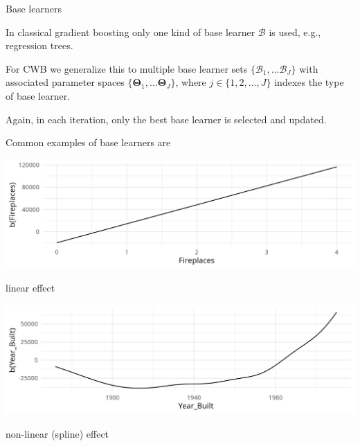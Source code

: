 \documentclass[11pt,compress,t,notes=noshow, xcolor=table]{beamer}
\begin{document}
\begin{vbframe}{Base learners}

In classical gradient boosting only one kind of base learner $\mathcal{B}$ is used, e.g.,
regression trees.

\lz

For CWB we generalize this to multiple base learner sets $\{ \mathcal{B}_1, ... \mathcal{B}_J \}$ with associated parameter spaces
$\{ \bm{\Theta}_1, ... \bm{\Theta}_J \}$,
%
 where $j \in \{ 1, 2, \dots, J \}$ indexes the type of base learner.
%
\lz

Again, in each iteration, only the best base learner
is selected and updated.

\framebreak

Common examples of base learners are

\begin{minipage}{0.4\textwidth}
    \includegraphics[width=\linewidth]{figure/compboost-base-learner-linear.png}
\end{minipage}\hfill
\begin{minipage}{0.5\textwidth}
  linear effect
\end{minipage}

\begin{minipage}{0.4\textwidth}
    \includegraphics[width=\linewidth]{figure/compboost-base-learner-spline.png}
\end{minipage}\hfill
\begin{minipage}{0.5\textwidth}
  non-linear (spline) effect
\end{minipage}


\end{vbframe}
\end{document}
